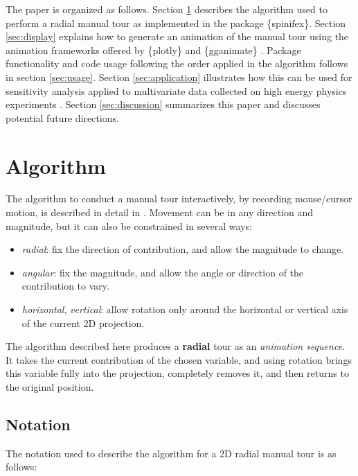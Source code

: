 \documentclass{template/monashthesis}
\begin{document}
The paper is organized as follows. Section \ref{sec:algorithm} describes the algorithm used to perform a radial manual tour as implemented in the package \{spinifex\}. Section \ref{sec:display} explains how to generate an animation of the manual tour using the animation frameworks offered by \{plotly\} \autocite{sievert_interactive_2020} and \{gganimate\} \autocite{pedersen_gganimate_2020}. Package functionality and code usage following the order applied in the algorithm follows in section \ref{sec:usage}. Section \ref{sec:application} illustrates how this can be used for sensitivity analysis applied to multivariate data collected on high energy physics experiments \autocite{wang_mapping_2018}. Section \ref{sec:discussion} summarizes this paper and discusses potential future directions.

\hypertarget{sec:algorithm}{%
\section{Algorithm}\label{sec:algorithm}}

The algorithm to conduct a manual tour interactively, by recording mouse/cursor motion, is described in detail in \textcite{cook_manual_1997}. Movement can be in any direction and magnitude, but it can also be constrained in several ways:

\begin{itemize}
\tightlist
\item
  \emph{radial}: fix the direction of contribution, and allow the magnitude to change.
\item
  \emph{angular}: fix the magnitude, and allow the angle or direction of the contribution to vary.
\item
  \emph{horizontal}, \emph{vertical}: allow rotation only around the horizontal or vertical axis of the current 2D projection.
\end{itemize}

The algorithm described here produces a \textbf{radial} tour as an \emph{animation sequence}. It takes the current contribution of the chosen variable, and using rotation brings this variable fully into the projection, completely removes it, and then returns to the original position.

\hypertarget{notation}{%
\subsection{Notation}\label{notation}}

The notation used to describe the algorithm for a 2D radial manual tour is as follows:
\end{document}
